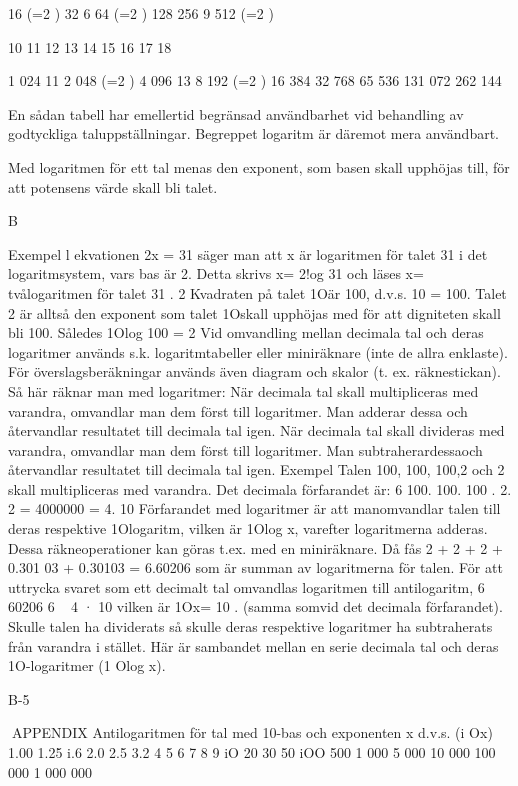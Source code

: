 \documentclass[a4paper,twoside,twocolumn,openright]{book}
\begin{document}
{{{{{{{{{{{{{16 (=2 )
32
6
64 (=2 )
128
256
9
512 (=2 )

10
11
12
13
14
15
16
17
18

1 024
11
2 048 (=2 )
4 096
13
8 192 (=2 )
16 384
32 768
65 536
131 072
262 144

En sådan tabell har emellertid begränsad
användbarhet vid behandling av godtyckliga
taluppställningar. Begreppet logaritm är däremot mera användbart.

Med logaritmen för ett tal menas den
exponent, som basen skall upphöjas till,
för att potensens värde skall bli talet.

B

Exempel
l ekvationen 2x = 31 säger man att x är
logaritmen för talet 31 i det logaritmsystem,
vars bas är 2.
Detta skrivs x= 2!og 31 och läses x= tvålogaritmen för talet 31 .
2
Kvadraten på talet 1Oär 100, d.v.s. 10 =
100. Talet 2 är alltså den exponent som talet
1Oskall upphöjas med för att digniteten skall
bli 100. Således 1Olog 100 = 2
Vid omvandling mellan decimala tal och
deras logaritmer används s.k. logaritmtabeller eller miniräknare (inte de allra enklaste). För överslagsberäkningar används
även diagram och skalor (t. ex. räknestickan).
Så här räknar man med logaritmer:
När decimala tal skall multipliceras med varandra, omvandlar man dem först till logaritmer. Man adderar dessa och återvandlar
resultatet till decimala tal igen.
När decimala tal skall divideras med varandra, omvandlar man dem först till logaritmer. Man subtraherardessaoch återvandlar
resultatet till decimala tal igen.
Exempel
Talen 100, 100, 100,2 och 2 skall multipliceras med varandra.
Det decimala förfarandet är:
6
100. 100. 100 . 2. 2 = 4000000 = 4. 10
Förfarandet med logaritmer är att manomvandlar talen till deras respektive 1Ologaritm, vilken är 1Olog x, varefter logaritmerna adderas. Dessa räkneoperationer kan
göras t.ex. med en miniräknare. Då fås
2 + 2 + 2 + 0.301 03 + 0.30103 = 6.60206 som
är summan av logaritmerna för talen.
För att uttrycka svaret som ett decimalt
tal omvandlas logaritmen till antilogaritm,
6 60206
6
~ 4 · 10
vilken är 1Ox= 10 .
(samma somvid det decimala förfarandet).
Skulle talen ha dividerats så skulle deras
respektive logaritmer ha subtraherats från
varandra i stället.
Här är sambandet mellan en serie decimala tal och deras 1O-logaritmer (1 Olog x).

B-5

APPENDIX
Antilogaritmen
för tal med
10-bas och
exponenten
x d.v.s. (i Ox)
1.00
1.25
i.6
2.0
2.5
3.2
4
5
6
7
8
9
iO
20
30
50
iOO
500
1 000
5 000
10 000
100 000
1 000 000

}}}}}}}}}}}}}
\end{document}
